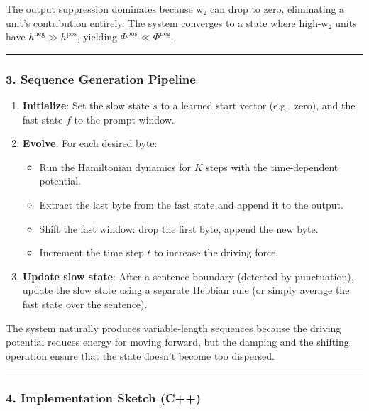 \documentclass[
  11pt,
  a4paper,
]{article}
\providecommand{\tightlist}{%
  \setlength{\itemsep}{0pt}\setlength{\parskip}{0pt}}
\begin{document}
The output suppression dominates because w₂ can drop to zero,
eliminating a unit's contribution entirely. The system converges to a
state where high-w₂ units have \(h^{\text{neg}} \gg h^{\text{pos}}\),
yielding \(\Phi^{\text{pos}} \ll \Phi^{\text{neg}}\).

\begin{center}\rule{0.5\linewidth}{0.5pt}\end{center}

\subsubsection{3. Sequence Generation
Pipeline}\label{sequence-generation-pipeline}

\begin{enumerate}
\def\labelenumi{\arabic{enumi}.}
\tightlist
\item
  \textbf{Initialize}: Set the slow state \(s\) to a learned start
  vector (e.g., zero), and the fast state \(f\) to the prompt window.
\item
  \textbf{Evolve}: For each desired byte:

  \begin{itemize}
  \tightlist
  \item
    Run the Hamiltonian dynamics for \(K\) steps with the time‑dependent
    potential.
  \item
    Extract the last byte from the fast state and append it to the
    output.
  \item
    Shift the fast window: drop the first byte, append the new byte.
  \item
    Increment the time step \(t\) to increase the driving force.
  \end{itemize}
\item
  \textbf{Update slow state}: After a sentence boundary (detected by
  punctuation), update the slow state using a separate Hebbian rule (or
  simply average the fast state over the sentence).
\end{enumerate}

The system naturally produces variable‑length sequences because the
driving potential reduces energy for moving forward, but the damping and
the shifting operation ensure that the state doesn't become too
dispersed.

\begin{center}\rule{0.5\linewidth}{0.5pt}\end{center}

\subsubsection{4. Implementation Sketch
(C++)}\label{implementation-sketch-c}
\end{document}
